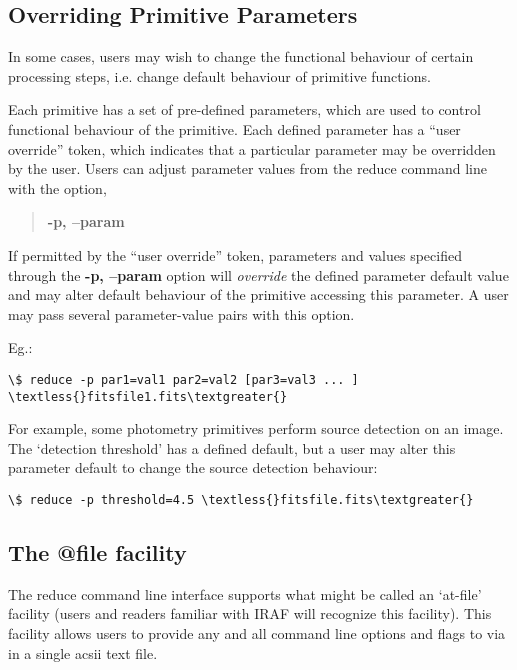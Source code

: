 \documentclass[letterpaper,10pt,english]{sphinxmanual}
\begin{document}
\subsection{Overriding Primitive Parameters}
\label{interfaces:userpars}\label{interfaces:overriding-primitive-parameters}
In some cases, users may wish to change the functional behaviour of certain
processing steps, i.e. change default behaviour of primitive
functions.

Each primitive has a set of pre-defined parameters, which are used to control
functional behaviour of the primitive. Each defined parameter has a ``user
override'' token, which indicates that a particular parameter may be overridden
by the user. Users can adjust parameter values from the reduce command line with
the option,
\begin{quote}

\textbf{-p, --param}
\end{quote}

If permitted by the ``user override'' token, parameters and values specified
through the \textbf{-p, --param} option will \emph{override} the defined
parameter default value and may alter default behaviour of the primitive
accessing this parameter. A user may pass several parameter-value pairs with
this option.

Eg.:

\begin{Verbatim}[commandchars=\\\{\}]
\$ reduce -p par1=val1 par2=val2 [par3=val3 ... ] \textless{}fitsfile1.fits\textgreater{}
\end{Verbatim}

For example, some photometry primitives perform source detection on an image.
The `detection threshold' has a defined default, but a user may alter this
parameter default to change the source detection behaviour:

\begin{Verbatim}[commandchars=\\\{\}]
\$ reduce -p threshold=4.5 \textless{}fitsfile.fits\textgreater{}
\end{Verbatim}


\subsection{The @file facility}
\label{interfaces:the-file-facility}\label{interfaces:atfile}
The reduce command line interface supports what might be called an `at-file'
facility (users and readers familiar with IRAF will recognize this facility).
This facility allows users to provide any and all command line options and flags
to  via in a single acsii text file.
\end{document}
